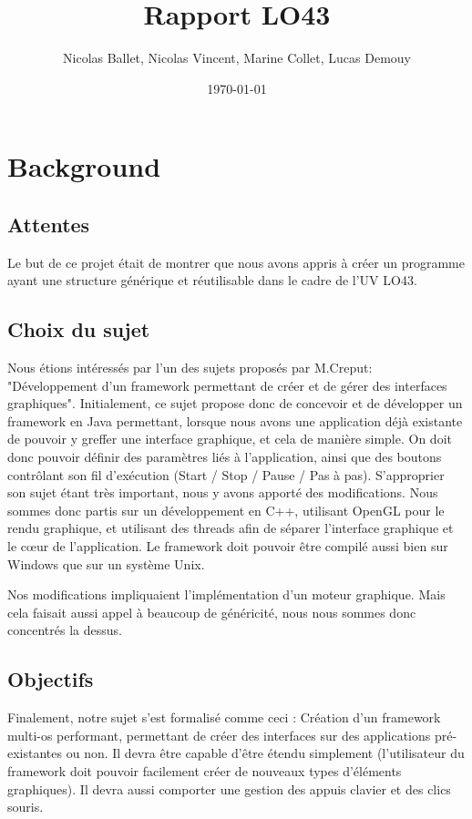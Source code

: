 \documentclass[a4paper]{report}
\title{Rapport LO43}
\author{Nicolas Ballet, Nicolas Vincent, Marine Collet, Lucas Demouy}
\date{\today}
\begin{document}
\maketitle

\tableofcontents

\chapter{Background}

\section{Attentes}

Le but de ce projet était de montrer que nous avons appris à créer un programme ayant une structure générique et
réutilisable dans le cadre de l'UV LO43.

\section{Choix du sujet}

Nous étions intéressés par l'un des sujets proposés par M.Creput: "Développement d'un framework permettant de créer et de
gérer des interfaces graphiques". Initialement, ce sujet propose donc de concevoir et de développer un framework en
Java permettant, lorsque nous avons une application déjà existante de pouvoir y greffer une interface graphique, et cela
de manière simple. On doit donc pouvoir définir des paramètres liés à l'application, ainsi que des boutons contrôlant
son fil d'exécution (Start / Stop / Pause / Pas à pas).
S'approprier son sujet étant très important, nous y avons apporté des
modifications. Nous sommes donc partis sur un développement en C++, utilisant OpenGL pour le rendu graphique, et
utilisant des threads afin de séparer l'interface graphique et le cœur de l'application. Le
framework doit pouvoir être compilé aussi bien sur Windows que sur un système Unix.

    \vspace{5mm}

Nos modifications impliquaient l'implémentation d'un moteur graphique. Mais cela faisait aussi appel à beaucoup de
généricité, nous nous sommes donc concentrés la dessus.

\section{Objectifs}

Finalement, notre sujet s'est formalisé comme ceci :
Création d'un framework multi-os performant, permettant de créer des interfaces sur des applications pré-existantes ou
non. Il devra être capable d'être étendu simplement (l'utilisateur du framework doit pouvoir facilement créer de
nouveaux types d'éléments graphiques). Il devra aussi comporter une gestion des appuis clavier et des clics souris.
\end{document}
